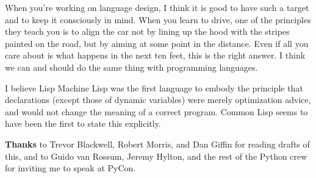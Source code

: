 When you're working on language design, I think it is good to have such
a target and to keep it consciously in mind. When you learn to drive,
one of the principles they teach you is to align the car not by lining
up the hood with the stripes painted on the road, but by aiming at some
point in the distance. Even if all you care about is what happens in the
next ten feet, this is the right answer. I think we can and should do
the same thing with programming languages.


I believe Lisp Machine Lisp was the first language to embody the
principle that declarations (except those of dynamic variables) were
merely optimization advice, and would not change the meaning of a
correct program. Common Lisp seems to have been the first to state this
explicitly.

\textbf{Thanks} to Trevor Blackwell, Robert Morris, and Dan Giffin for
reading drafts of this, and to Guido van Rossum, Jeremy Hylton, and the
rest of the Python crew for inviting me to speak at PyCon.